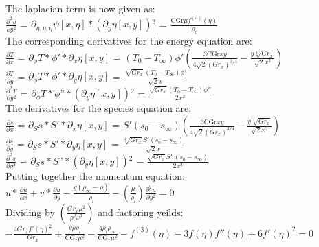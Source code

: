 \documentclass[letterpaper, 10pt]{article}
\begin{document}
	\noindent The laplacian term is now given as:\\
	$\frac{\partial^2 u}{\partial y^2}$ = $\partial _{\eta ,\eta ,\eta }\psi [x,\eta ]*\left(\partial _y\eta [x,y]\right){}^3$ = $\frac{\text{CGr} \mu  f^{(3)}(\eta )}{\rho_l}$\\

	\noindent The corresponding derivatives for the energy equation are:\\
	$\frac{\partial T}{\partial x}$ = $\partial _{\phi }T*\phi '*\partial _x\eta [x,y]$ = 
	$(T_0-T_\infty) \phi ' \left(\frac{3 \text{CGr} x y}{4 \sqrt{2} \left(Gr_x\right)^{3/4}}-\frac{y \sqrt[4]{Gr_x}}{\sqrt{2} x^2}\right)$\\
	$\frac{\partial T}{\partial y}$ = $ \partial _{\phi }T*\phi '*\partial _y\eta [x,y]$ = $\frac{\sqrt[4]{Gr_x} (T_0-T_\infty) \phi '}{\sqrt{2} x}$\\
	$\frac{\partial^2 T}{\partial y^2}$ = $\partial _{\phi }T*\phi \text{''}*\left(\partial _y\eta [x,y]\right){}^2$ = $\frac{\sqrt{Gr_x} (T_0-T_\infty) \phi ''}{2 x^2}$\\

	\noindent The derivatives for the species equation are:\\
	$\frac{\partial s}{\partial x}$ = $\partial _Ss * S'*\partial _x\eta [x,y]$ = $S' (s_0-s_\infty) \left(\frac{3 \text{CGr} x y}{4 \sqrt{2} \left(Gr_x\right)^{3/4}}-\frac{y \sqrt[4]{Gr_x}}{\sqrt{2} x^2}\right)$\\
	$\frac{\partial s}{\partial y}$ = $\partial _Ss * S'*\partial _y\eta [x,y]$ = $\frac{\sqrt[4]{Gr_x} S' (s_0-s_\infty)}{\sqrt{2} x}$\\
	$\frac{\partial^2 s}{\partial y^2}$ = $\partial _Ss* S\text{''}*\left(\partial _y\eta [x,y]\right){}^2$ = $\frac{\sqrt{Gr_x} S'' (s_0-s_\infty)}{2 x^2}$\\

	\noindent Putting together the momentum equation:\\
	$u*\frac{\partial u}{\partial x}+v*\frac{\partial u}{\partial y}-\frac{g(\rho_\infty -\rho )}{\rho_l}-\left(\frac{\mu }{\rho_l}\right)\frac{\partial^2 u}{\partial y^2} = 0$\\

	\noindent Dividing by $\left(\frac{Gr_x\mu ^2}{ \rho_l^2 x^3}\right)$ and factoring yeilds:\\
	$-\frac{4 Gr_x f'(\eta )^2}{Gr_x}+\frac{g \rho  \rho_l}{\text{CGr} \mu^2}-\frac{g \rho_l \rho_\infty}{\text{CGr} \mu^2}-f^{(3)}(\eta )-3 f(\eta ) f''(\eta )+6 f'(\eta )^2 = 0$\\
\end{document}
